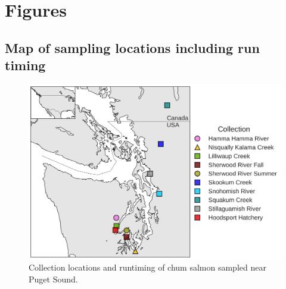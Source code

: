 \documentclass[12pt, one column]{article}
\begin{document}
% 

\listoffigures 

\listoftables

\pagebreak
\section*{Figures}
\subsection*{Map of sampling locations including run timing}
\begin{figure}[H]
\includegraphics[scale=.6]{figures/collection_map_colors.png}
\caption[Collection locations]{Collection locations and runtiming of chum salmon sampled near Puget Sound.}
\end{figure}
\end{document}
